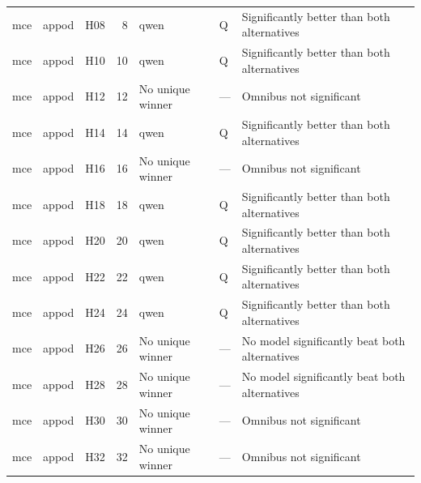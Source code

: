 \begin{longtable}{lllrlll}
mce & appod & H08 & 8 & qwen & Q & Significantly better than both alternatives \\
mce & appod & H10 & 10 & qwen & Q & Significantly better than both alternatives \\
mce & appod & H12 & 12 & No unique winner & — & Omnibus not significant \\
mce & appod & H14 & 14 & qwen & Q & Significantly better than both alternatives \\
mce & appod & H16 & 16 & No unique winner & — & Omnibus not significant \\
mce & appod & H18 & 18 & qwen & Q & Significantly better than both alternatives \\
mce & appod & H20 & 20 & qwen & Q & Significantly better than both alternatives \\
mce & appod & H22 & 22 & qwen & Q & Significantly better than both alternatives \\
mce & appod & H24 & 24 & qwen & Q & Significantly better than both alternatives \\
mce & appod & H26 & 26 & No unique winner & — & No model significantly beat both alternatives \\
mce & appod & H28 & 28 & No unique winner & — & No model significantly beat both alternatives \\
mce & appod & H30 & 30 & No unique winner & — & Omnibus not significant \\
mce & appod & H32 & 32 & No unique winner & — & Omnibus not significant \\
\end{longtable}
